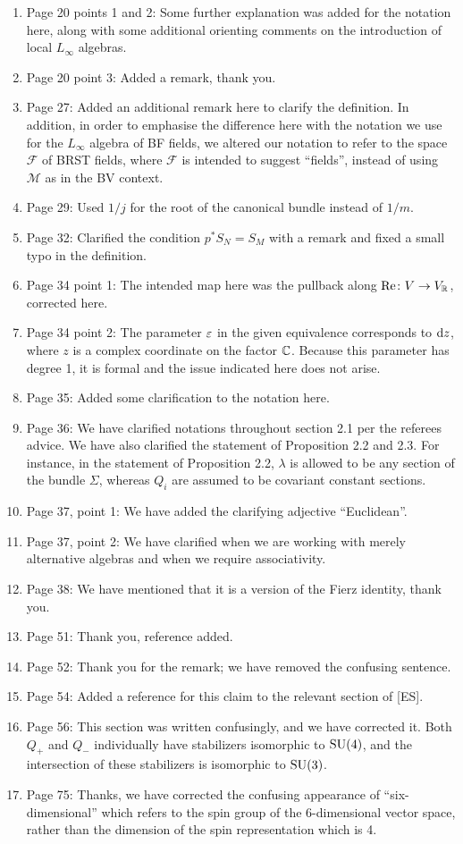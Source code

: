 \documentclass[10pt, oneside]{article}
\begin{document}
\begin{enumerate}
 \item Page 20 points 1 and 2: Some further explanation was added for the notation here, along with some additional orienting comments on the introduction of local $L_\infty$ algebras.
 \item Page 20 point 3: Added a remark, thank you.
 \item Page 27: Added an additional remark here to clarify the definition.  In addition, in order to emphasise the difference here with the notation we use for the $L_\infty$ algebra of BF fields, we altered our notation to refer to the space $\mathcal F$ of BRST fields, where $\mathcal F$ is intended to suggest ``fields'', instead of using $\mathcal M$ as in the BV context. \item Page 29: Used $1/j$ for the root of the canonical bundle instead of $1/m$.
 \item Page 32: Clarified the condition $p^*S_N = S_M$ with a remark and fixed a small typo in the definition.
 \item Page 34 point 1: The intended map here was the pullback along $\mathrm{Re} \colon V \to V_\mathbb R$, corrected here.
 \item Page 34 point 2: The parameter $\varepsilon$ in the given equivalence corresponds to ${\rm d} z$, where $z$ is a complex coordinate on the factor $\mathbb C$.  Because this parameter has degree 1, it is formal and the issue indicated here does not arise.
 \item Page 35: Added some clarification to the notation here.
 \item Page 36: We have clarified notations throughout section 2.1 per the referees advice.  We have also clarified the statement of Proposition 2.2 and 2.3.  For instance, in the statement of Proposition 2.2, $\lambda$ is allowed to be any section of the bundle $\Sigma$, whereas $Q_i$ are assumed to be covariant constant sections.
 \item Page 37, point 1: We have added the clarifying adjective ``Euclidean''.
 \item Page 37, point 2: We have clarified when we are working with merely alternative algebras and when we require associativity.
 \item Page 38: We have mentioned that it is a version of the Fierz identity, thank you.
 \item Page 51: Thank you, reference added.
 \item Page 52: Thank you for the remark; we have removed the confusing sentence.
 \item Page 54: Added a reference for this claim to the relevant section of [ES].
 \item Page 56: This section was written confusingly, and we have corrected it.  Both $Q_+$ and $Q_-$ individually have stabilizers isomorphic to $\mathrm{SU}(4)$, and the intersection of these stabilizers is isomorphic to $\mathrm{SU}(3)$.
 \item Page 75: Thanks, we have corrected the confusing appearance of ``six-dimensional'' which refers to the spin group of the 6-dimensional vector space, rather than the dimension of the spin representation which is 4.
\end{enumerate}

 
\end{document}
